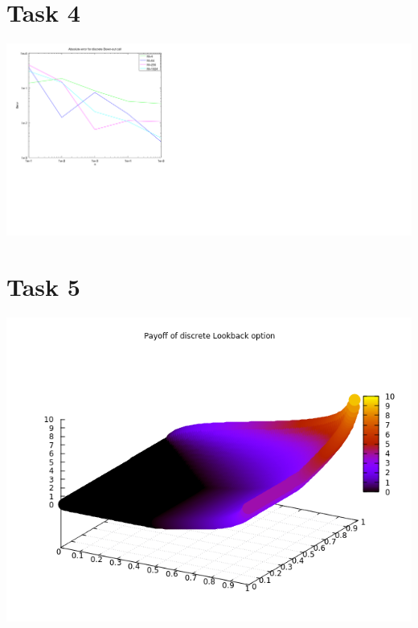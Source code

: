 \documentclass[10pt,a4paper]{article}
\begin{document}
\section*{Task 4}

\begin{center}
	\includegraphics[scale=0.5]{convergence_plot_discrete_down_out_call.png}
\end{center}

\section*{Task 5}

\begin{center}
	\includegraphics[scale=0.5]{payoff_lookback.png}
\end{center}
\end{document}
